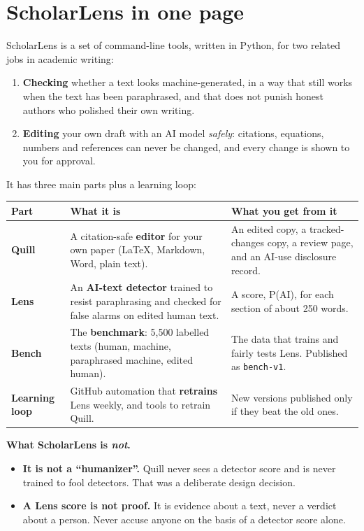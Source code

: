 \documentclass[11pt]{article}
\newcommand{\cm}[1]{\texttt{#1}}
\begin{document}
\section{ScholarLens in one page}

ScholarLens is a set of command-line tools, written in Python, for two related jobs in academic writing:

\begin{enumerate}
  \item \textbf{Checking} whether a text looks machine-generated, in a way that still works when the text has been paraphrased, and that does not punish honest authors who polished their own writing.
  \item \textbf{Editing} your own draft with an AI model \emph{safely}: citations, equations, numbers and references can never be changed, and every change is shown to you for approval.
\end{enumerate}

It has three main parts plus a learning loop:

\begin{tabularx}{\linewidth}{@{}>{\bfseries}l X X@{}}
\toprule
Part & What it is & What you get from it \\
\midrule
Quill & A citation-safe \textbf{editor} for your own paper (LaTeX, Markdown, Word, plain text). & An edited copy, a tracked-changes copy, a review page, and an AI-use disclosure record. \\
Lens & An \textbf{AI-text detector} trained to resist paraphrasing and checked for false alarms on edited human text. & A score, P(AI), for each section of about 250 words. \\
Bench & The \textbf{benchmark}: 5,500 labelled texts (human, machine, paraphrased machine, edited human). & The data that trains and fairly tests Lens. Published as \cm{bench-v1}. \\
Learning loop & GitHub automation that \textbf{retrains} Lens weekly, and tools to retrain Quill. & New versions published only if they beat the old ones. \\
\bottomrule
\end{tabularx}

\begin{warn}
\textbf{What ScholarLens is \emph{not}.}
\begin{itemize}
  \item \textbf{It is not a ``humanizer''.} Quill never sees a detector score and is never trained to fool detectors. That was a deliberate design decision.
  \item \textbf{A Lens score is not proof.} It is evidence about a text, never a verdict about a person. Never accuse anyone on the basis of a detector score alone.
\end{itemize}
\end{warn}
\end{document}
